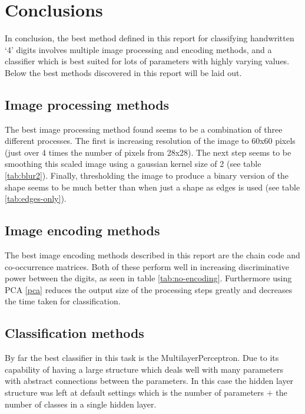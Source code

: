 \documentclass[12pt]{article}
\begin{document}
\section{Conclusions}
  In conclusion, the best method defined in this report for classifying handwritten ‘4’ digits involves multiple image processing and encoding methods, and a classifier which is best suited for lots of parameters with highly varying values. Below the best methods discovered in this report will be laid out.

  \subsection{Image processing methods} \label{improc}
    The best image processing method found seems to be a combination of three different processes. The first is increasing resolution of the image to 60x60 pixels (just over 4 times the number of pixels from 28x28). The next step seems to be smoothing this scaled image using a gaussian kernel size of 2 (see table \ref{tab:blur2}). Finally, thresholding the image to produce a binary version of the shape seems to be much better than when just a shape as edges is used (see table \ref{tab:edges-only}).

  \subsection{Image encoding methods} \label{imenc}
    The best image encoding methods described in this report are the chain code and co-occurrence matrices. Both of these perform well in increasing discriminative power between the digits, as seen in table \ref{tab:no-encoding}. Furthermore using PCA \ref{pca} reduces the output size of the processing steps greatly and decreases the time taken for classification.

  \subsection{Classification methods} \label{imcls}
    By far the best classifier in this task is the MultilayerPerceptron. Due to its capability of having a large structure which deals well with many parameters with abstract connections between the parameters. In this case the hidden layer structure was left at default settings which is the number of parameters $+$ the number of classes in a single hidden layer.
\end{document}
